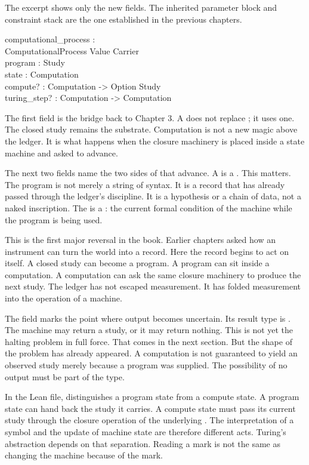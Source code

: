 The excerpt shows only the new fields. The inherited parameter block and
constraint stack are the one established in the previous chapters.

\begin{leancode}
computational\_process :\\
\quad ComputationalProcess Value Carrier\\
program : Study\\
state : Computation\\
compute? : Computation -> Option Study\\
turing\_step? : Computation -> Computation
\end{leancode}

The first field is the bridge back to Chapter 3. A  does
not replace ; it uses one. The closed study remains
the substrate. Computation is not a new magic above the ledger. It is what
happens when the closure machinery is placed inside a state machine and asked
to advance.

The next two fields name the two sides of that advance. A  is a
. This matters. The program is not merely a string of syntax. It is
a record that has already passed through the ledger's discipline. It is a
hypothesis or a chain of data, not a naked inscription. The  is a
: the current formal condition of the machine while the
program is being used.

This is the first major reversal in the book. Earlier chapters asked how an
instrument can turn the world into a record. Here the record begins to act on
itself. A closed study can become a program. A program can sit inside a
computation. A computation can ask the same closure machinery to produce the
next study. The ledger has not escaped measurement. It has folded measurement
into the operation of a machine.

The field  marks the point where output becomes uncertain. Its
result type is . The machine may return a study, or it may
return nothing. This is not yet the halting problem in full force. That comes
in the next section. But the shape of the problem has already appeared. A
computation is not guaranteed to yield an observed study merely because a
program was supplied. The possibility of no output must be part of the type.

In the Lean file,  distinguishes a program state from a compute
state. A program state can hand back the study it carries. A compute state
must pass its current study through the closure operation of the underlying
. The interpretation of a symbol and the update of
machine state are therefore different acts. Turing's abstraction depends on
that separation. Reading a mark is not the same as changing the machine because
of the mark.


